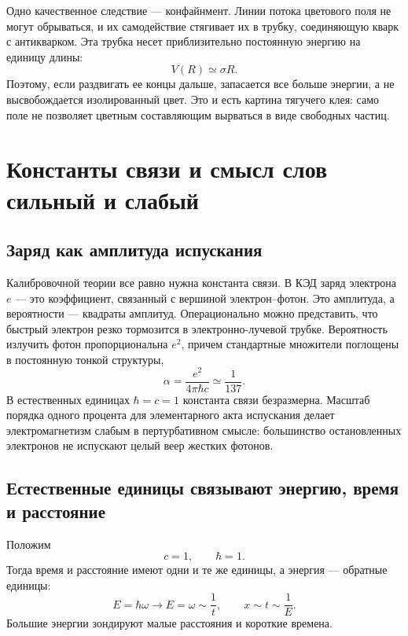 Одно качественное следствие — конфайнмент. Линии потока цветового поля не могут обрываться, и их самодействие стягивает их в трубку, соединяющую кварк с антикварком. Эта трубка несет приблизительно постоянную энергию на единицу длины:
\begin{equation}
V(R)\simeq \sigma R.
\end{equation}
Поэтому, если раздвигать ее концы дальше, запасается все больше энергии, а не высвобождается изолированный цвет. Это и есть картина тягучего клея: само поле не позволяет цветным составляющим вырваться в виде свободных частиц.

\section{Константы связи и смысл слов сильный и слабый}

\subsection{Заряд как амплитуда испускания}

Калибровочной теории все равно нужна константа связи. В КЭД заряд электрона \(e\) — это коэффициент, связанный с вершиной электрон--фотон. Это амплитуда, а вероятности — квадраты амплитуд. Операционально можно представить, что быстрый электрон резко тормозится в электронно-лучевой трубке. Вероятность излучить фотон пропорциональна \(e^2\), причем стандартные множители поглощены в постоянную тонкой структуры,
\begin{equation}
\alpha=\frac{e^2}{4\pi\hbar c}
\simeq \frac{1}{137}.
\label{eq:l5-alpha}
\end{equation}
В естественных единицах \(\hbar=c=1\) константа связи безразмерна. Масштаб порядка одного процента для элементарного акта испускания делает электромагнетизм слабым в пертурбативном смысле: большинство остановленных электронов не испускают целый веер жестких фотонов.

\subsection{Естественные единицы связывают энергию, время и расстояние}

Положим
\begin{equation}
c=1,
\qquad
\hbar=1.
\end{equation}
Тогда время и расстояние имеют одни и те же единицы, а энергия — обратные единицы:
\begin{equation}
E=\hbar\omega\longrightarrow E=\omega\sim\frac1t,
\qquad
x\sim t\sim\frac1E.
\end{equation}
Большие энергии зондируют малые расстояния и короткие времена.

